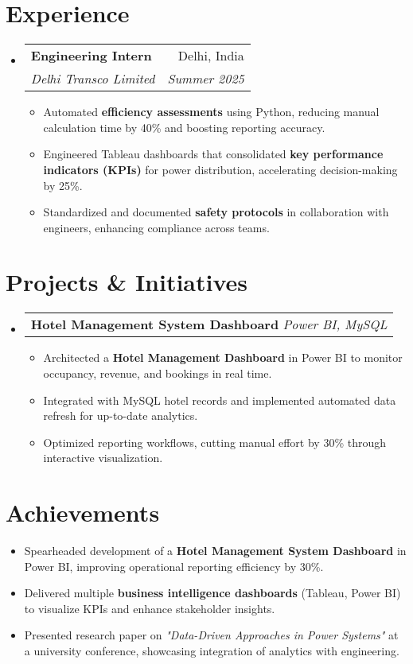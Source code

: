 \documentclass[a4paper,11pt]{article}
\makeatletter
\newcommand{\resumeItem}[1]{
  \item\small{{#1 \vspace{-2pt}}}
}
\newcommand{\resumeSubheading}[4]{
  \vspace{-2pt}\item
  \begin{tabular*}{0.97\textwidth}[t]{l@{\extracolsep{\fill}}r}
    \textbf{#1} & #2 \\
    \textit{\small#3} & \textit{\small #4} \\
  \end{tabular*}\vspace{-7pt}
}
\newcommand{\resumeProjectHeading}[2]{
  \vspace{-2pt}\item
  \begin{tabular*}{0.97\textwidth}[t]{l@{\extracolsep{\fill}}}
    \textbf{#1} \textit{\small#2} \\
  \end{tabular*}\vspace{-7pt}
}
\makeatother
\begin{document}
\section*{Experience}
\begin{itemize}[leftmargin=*]
  \resumeSubheading
    {Engineering Intern}{Delhi, India}
    {Delhi Transco Limited}{Summer 2025}
    \begin{itemize}
        \resumeItem{Automated \textbf{efficiency assessments} using Python, reducing manual calculation time by 40\% and boosting reporting accuracy.}
        \resumeItem{Engineered Tableau dashboards that consolidated \textbf{key performance indicators (KPIs)} for power distribution, accelerating decision-making by 25\%.}
        \resumeItem{Standardized and documented \textbf{safety protocols} in collaboration with engineers, enhancing compliance across teams.}
    \end{itemize}
\end{itemize}

\section*{Projects \& Initiatives}
\begin{itemize}[leftmargin=*]
  \resumeProjectHeading
    {Hotel Management System Dashboard}{Power BI, MySQL}
    \begin{itemize}
        \resumeItem{Architected a \textbf{Hotel Management Dashboard} in Power BI to monitor occupancy, revenue, and bookings in real time.}
        \resumeItem{Integrated with MySQL hotel records and implemented automated data refresh for up-to-date analytics.}
        \resumeItem{Optimized reporting workflows, cutting manual effort by 30\% through interactive visualization.}
    \end{itemize}
\end{itemize}

\section*{Achievements}
\begin{itemize}[leftmargin=*]
  \resumeItem{Spearheaded development of a \textbf{Hotel Management System Dashboard} in Power BI, improving operational reporting efficiency by 30\%.}
  \resumeItem{Delivered multiple \textbf{business intelligence dashboards} (Tableau, Power BI) to visualize KPIs and enhance stakeholder insights.}
  \resumeItem{Presented research paper on \textit{"Data-Driven Approaches in Power Systems"} at a university conference, showcasing integration of analytics with engineering.}
\end{itemize}
\end{document}
